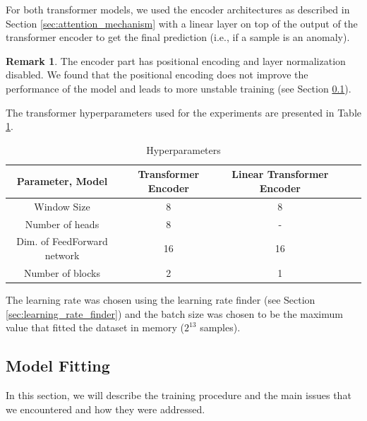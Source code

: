 \documentclass[a4paper, twoside]{report}
\theoremstyle{definition}
\newtheorem{remark}[theorem]{Remark}
\numberwithin{equation}{section}
\begin{document}
For both transformer models, we used the encoder architectures as described in Section \ref{sec:attention_mechanism}
with a linear layer on top of the output of the transformer encoder to get the final prediction (i.e., if a sample is an anomaly).
\begin{remark}
    The encoder part has positional encoding and layer normalization disabled.
    We found that the positional encoding does not improve the performance of the model and leads to more
    unstable training (see Section \ref{sec:training}).
\end{remark}

The transformer hyperparameters used for the experiments are presented in Table \ref{tab:hyperparameters}.

\begin{table}[h!]
    \centering
    \begin{tabular}{|c|c|c|c|c|}
        \hline
        Parameter, Model            & Transformer Encoder & Linear Transformer Encoder \\
        \hline
        Window Size                 & 8                   & 8                          \\
        Number of heads             & 8                   & -                          \\
        Dim. of FeedForward network & 16                  & 16                         \\
        Number of blocks            & 2                   & 1                          \\
        \hline
    \end{tabular}
    \caption{Hyperparameters}
    \label{tab:hyperparameters}
\end{table}

The learning rate was chosen using the learning rate finder \cite{1506.01186} (see Section \ref{sec:learning_rate_finder})
and the batch size was chosen to be the maximum value that
fitted the dataset in memory ($2^{13}$ samples).


\subsection{Model Fitting} \label{sec:training}

In this section, we will describe the training procedure and the main issues that we encountered and how they were addressed.
\end{document}
